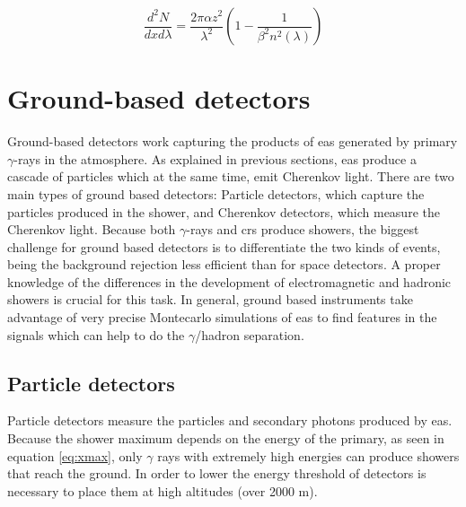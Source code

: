 \documentclass[main.tex]{subfiles}
\begin{document}
\begin{equation}
    \frac{d^2N}{dxd\lambda} = \frac{2\pi \alpha z^2}{\lambda^2}\left( 1-\frac{1}{\beta^2 n^2(\lambda)}\right)
\end{equation}

\section{Ground-based detectors} \label{sec:grounddet}

Ground-based detectors work capturing the products of \gls{eas} generated by primary $\gamma$-rays in the atmosphere. As explained in previous sections, \gls{eas} produce a cascade of particles which at the same time, emit Cherenkov light. There are two main types of ground based detectors: Particle detectors, which capture the particles produced in the shower, and Cherenkov detectors, which measure the Cherenkov light. Because both $\gamma$-rays and \glspl{cr} produce showers, the biggest challenge for ground based detectors is to differentiate the two kinds of events, being the background rejection less efficient than for space detectors. A proper knowledge of the differences in the development of electromagnetic and hadronic showers is crucial for this task. In general, ground based instruments take advantage of very precise Montecarlo simulations of \gls{eas} to find features in the signals which can help to do the $\gamma$/hadron separation.\\

\subsection{Particle detectors}

Particle detectors measure the particles and secondary photons produced by \gls{eas}. Because the shower maximum depends on the energy of the primary, as seen in equation \ref{eq:xmax}, only $\gamma$ rays with extremely high energies can produce showers that reach the ground. In order to lower the energy threshold of detectors is necessary to place them at high altitudes (over 2000 m). \\
\end{document}
